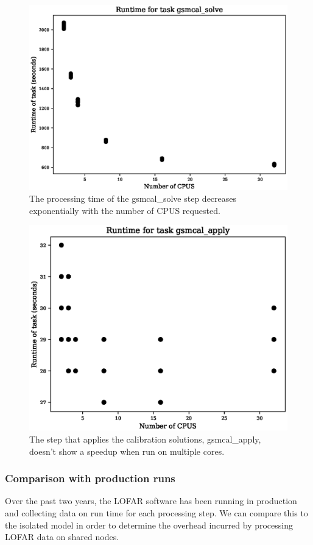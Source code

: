 \documentclass[preprint,5p]{elsarticle}
\begin{document}
\begin{figure}
    \includegraphics[width=0.95\linewidth]{figures/gsmcal_solve_NCPU.eps}
      \caption{The processing time of the gsmcal\_solve step decreases exponentially with the number of CPUS requested. }
	\label{fig:gsmcal_solve_NCPU}
\end{figure}

\begin{figure}
    \includegraphics[width=0.95\linewidth]{figures/gsmcal_apply_NCPU.eps}
      \caption{The step that applies the calibration solutions, gsmcal\_apply, doesn't show a speedup when run on multiple cores. }
	\label{fig:gsmcal_apply_NCPU}
\end{figure}

\subsubsection{Comparison with production runs}
Over the past two years, the LOFAR software has been running in production and collecting data on run time for each processing step. We can compare this to the isolated model in order to determine the overhead incurred by processing LOFAR data on shared nodes. 
\end{document}
